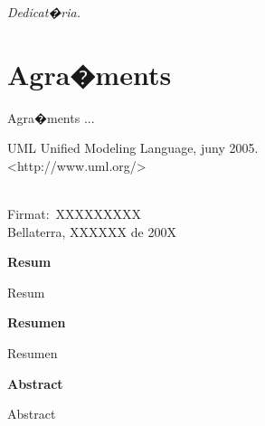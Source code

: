 \documentclass[a4paper,12pt,catalan]{book}
\begin{document}
\newpage 
\vspace*{1 cm} \vspace*{2in} 
\begin{flushright} 
\begin{minipage}{4in} 
\begin{flushright} {\em Dedicat�ria.} 
\end{flushright} 
\end{minipage} 
\end{flushright} \rm


\chapter*{Agra�ments}

Agra�ments ...

\tableofcontents

\listoffigures

\newpage
{}
\pagestyle{headings}



%
%
%
%
%


\begin{thebibliography}{CMMS00}


 UML Unified Modeling Language, juny 2005.\\<http://www.uml.org/>

\end{thebibliography}


\newpage 

\pagestyle{plain} 
\vspace*{6cm} 
\begin{center} 
\begin{minipage}{4in} 
\parindent=0pt \vspace*{1in} 
\begin{center} 
\vrule width 3in height 0.4pt
\\Firmat:\ XXXXXXXXX
\\ Bellaterra, XXXXXX de 200X
\end{center} 
\end{minipage} 
\end{center} 

\newpage 

\thispagestyle{empty}

\vfill{}
{\par\centering \textbf{\large Resum}\large \par}

Resum

\vfill{}

{\par\centering \textbf{\large Resumen}\large \par}

Resumen

\vfill{}

{\par\centering \textbf{\large Abstract}\large \par}

Abstract

\vfill{}
\end{document}
